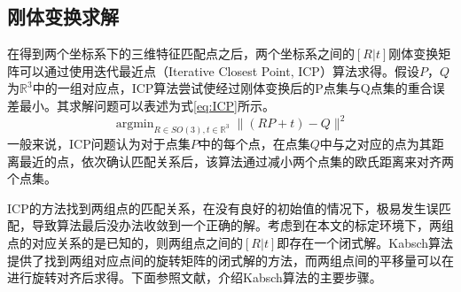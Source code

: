 \subsection{刚体变换求解}

在得到两个坐标系下的三维特征匹配点之后，两个坐标系之间的$[R|t]$刚体变换矩阵可以通过使用迭代最近点（Iterative Closest Point, ICP）算法求得。假设$P$，$Q$为$\mathbb{R}^3$中的一组对应点，ICP算法尝试使经过刚体变换后的P点集与Q点集的重合误差最小。其求解问题可以表述为式\ref{eq:ICP}所示。
\begin{equation}
    \mathop{\arg\min}_{R\in SO(3), t\in \mathbb{R}^3}  \| (RP+t)-Q \|^2 
    \label{eq:ICP}
\end{equation}
一般来说，ICP问题认为对于点集$P$中的每个点，在点集$Q$中与之对应的点为其距离最近的点，依次确认匹配关系后，该算法通过减小两个点集的欧氏距离来对齐两个点集。

ICP的方法找到两组点的匹配关系，在没有良好的初始值的情况下，极易发生误匹配，导致算法最后没办法收敛到一个正确的解。考虑到在本文的标定环境下，两组点的对应关系的是已知的，则两组点之间的$[R|t]$即存在一个闭式解。Kabsch算法提供了找到两组对应点间的旋转矩阵的闭式解的方法，而两组点间的平移量可以在进行旋转对齐后求得。下面参照文献，介绍Kabsch算法的主要步骤。

